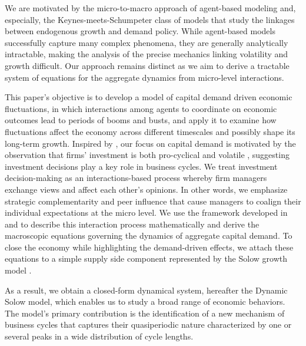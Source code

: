 \documentclass[authoryear, review]{elsarticle}
\begin{document}
We are motivated by the micro-to-macro approach of agent-based modeling \citep{LeBaronTesfatsion2008, DawidDelliGatti2018a, HommesLeBaron2018} and, especially, the Keynes-meets-Schumpeter class of models \citep{DosiEtAl2010, DosiEtAl2015} that study the linkages between endogenous growth and demand policy. While agent-based models successfully capture many complex phenomena, they are generally analytically intractable, making the analysis of the precise mechanics linking volatility and growth difficult. Our approach remains distinct as we aim to derive a tractable system of equations for the aggregate dynamics from micro-level interactions.

This paper's objective is to develop a model of capital demand driven economic fluctuations, in which interactions among agents to coordinate on economic outcomes lead to periods of booms and busts, and apply it to examine how fluctuations affect the economy across different timescales and possibly shape its long-term growth. Inspired by \citet{Keynes1936}, our focus on capital demand is motivated by the observation that firms' investment is both pro-cyclical and volatile \citep{StockWatson1999}, suggesting investment decisions play a key role in business cycles. We treat investment decision-making as an interactions-based process whereby firm managers exchange views and affect each other's opinions. In other words, we emphasize strategic complementarity and peer influence that cause managers to coalign their individual expectations at the micro level. We use the framework developed in \citet{GusevEtAl2015} and \citet{KroujilineEtAl2016} to describe this interaction process mathematically and derive the macroscopic equations governing the dynamics of aggregate capital demand. To close the economy while highlighting the demand-driven effects, we attach these equations to a simple supply side component represented by the Solow growth model \citeyearpar{Solow1956}. 

As a result, we obtain a closed-form dynamical system, hereafter the Dynamic Solow model, which enables us to study a broad range of economic behaviors. The model’s primary contribution is the identification of a new mechanism of business cycles that captures their quasiperiodic nature characterized by one or several peaks in a wide distribution of cycle lengths.
\end{document}
